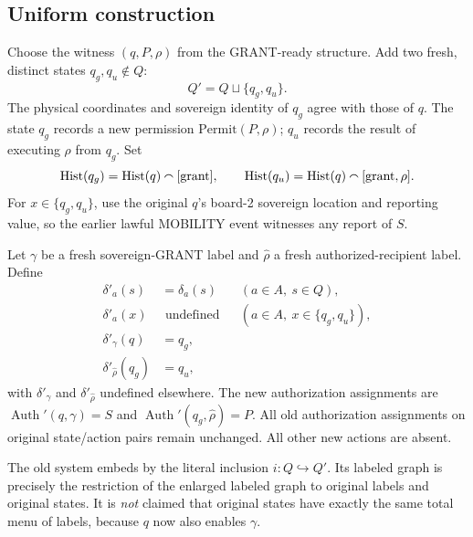\documentclass[11pt,letterpaper]{article}
\theoremstyle{definition}\newtheorem{definition}[theorem]{Definition}\newtheorem{example}[theorem]{Example}
\theoremstyle{remark}\newtheorem{remark}[theorem]{Remark}
\providecommand{\Auth}{\operatorname{Auth}}
\providecommand{\Hist}{\operatorname{Hist}}
\begin{document}
\subsection{Uniform construction}
Choose the witness $(q,P,\rho)$ from the GRANT-ready structure. Add two fresh, distinct states $q_g,q_u\notin Q$:
\[
Q'=Q\sqcup\{q_g,q_u\}.
\]
The physical coordinates and sovereign identity of $q_g$ agree with those of $q$. The state $q_g$ records a new permission $\mathrm{Permit}(P,\rho)$; $q_u$ records the result of executing $\rho$ from $q_g$. Set
\[
\Hist(q_g)=\Hist(q)\mathbin{\raisebox{0.15ex}{$\smallfrown$}}[\mathrm{grant}],\qquad
\Hist(q_u)=\Hist(q)\mathbin{\raisebox{0.15ex}{$\smallfrown$}}[\mathrm{grant},\rho].
\]
For $x\in\{q_g,q_u\}$, use the original $q$'s board-2 sovereign location and reporting value, so the earlier lawful MOBILITY event witnesses any report of $S$.

Let $\gamma$ be a fresh sovereign-GRANT label and $\widehat\rho$ a fresh authorized-recipient label. Define
\begin{align*}
\delta'_a(s)&=\delta_a(s) &&(a\in A,\ s\in Q),\\
\delta'_a(x)&\text{ undefined} &&(a\in A,\ x\in\{q_g,q_u\}),\\
\delta'_{\gamma}(q)&=q_g,\\
\delta'_{\widehat\rho}(q_g)&=q_u,
\end{align*}
with $\delta'_{\gamma}$ and $\delta'_{\widehat\rho}$ undefined elsewhere. The new authorization assignments are $\Auth'(q,\gamma)=S$ and $\Auth'(q_g,\widehat\rho)=P$. All old authorization assignments on original state/action pairs remain unchanged. All other new actions are absent.

The old system embeds by the literal inclusion $i:Q\hookrightarrow Q'$. Its labeled graph is precisely the restriction of the enlarged labeled graph to original labels and original states. It is \emph{not} claimed that original states have exactly the same total menu of labels, because $q$ now also enables $\gamma$.
\end{document}

